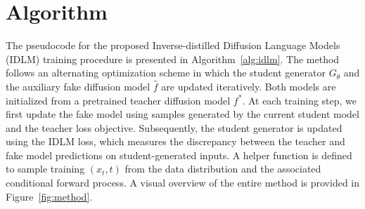 \section{Algorithm}
The pseudocode for the proposed Inverse-distilled Diffusion Language Models (IDLM) training procedure is presented in Algorithm~\ref{alg:idlm}. The method follows an alternating optimization scheme in which the student generator $G_{\theta}$ and the auxiliary fake diffusion model $\widehat{f}$ are updated iteratively. Both models are initialized from a pretrained teacher diffusion model $f^*$. At each training step, we first update the fake model using samples generated by the current student model and the teacher loss objective. Subsequently, the student generator is updated using the IDLM loss, which measures the discrepancy between the teacher and fake model predictions on student-generated inputs. A helper function is defined to sample training $(x_t, t)$ from the data distribution and the associated conditional forward process. A visual overview of the entire method is provided in Figure~\ref{fig:method}.
\label{app:algorithm}
